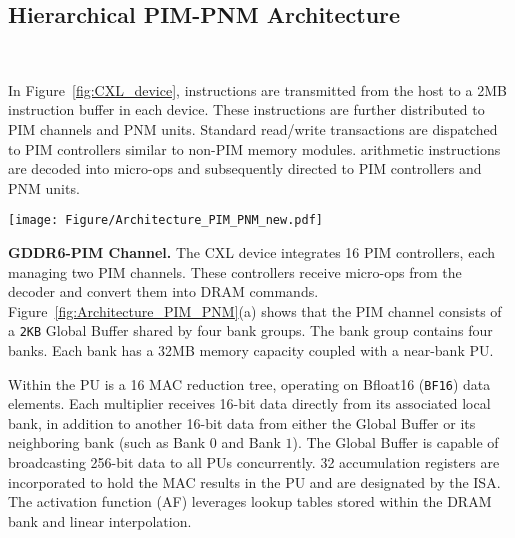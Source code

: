 \vspace{-3mm}

\subsection{Hierarchical PIM-PNM Architecture}~\label{subsec:pim_pnm_arch}

In Figure~\ref{fig:CXL_device}, \att{} instructions are transmitted from the host to a 2MB instruction buffer in each device. These instructions are further distributed to PIM channels and PNM units.
Standard read/write transactions are dispatched to PIM controllers similar to non-PIM memory modules. \att{} arithmetic instructions are decoded into micro-ops and subsequently directed to PIM controllers and PNM units. 

\begin{figure*}[htbp]
	\centering
  	\texttt{[image: Figure/Architecture\_PIM\_PNM\_new.pdf]}
    \caption{Hierarchical PIM-PNM Architecture}
	\label{fig:Architecture_PIM_PNM}
\end{figure*}

\textbf{GDDR6-PIM Channel.}
The CXL device integrates 16 PIM controllers, each managing two PIM channels. These controllers receive micro-ops from the decoder and convert them into DRAM commands.
Figure~\ref{fig:Architecture_PIM_PNM}(a) shows that the PIM channel consists of a \texttt{2KB} Global Buffer shared by four bank groups.
The bank group contains four banks.
Each bank has a 32MB memory capacity coupled with a near-bank PU.
% 

Within the PU is a 16 MAC reduction tree, operating on Bfloat16 (\texttt{BF16}) data elements. Each multiplier receives 16-bit data directly from its associated local bank, in addition to another 16-bit data from either the Global Buffer or its neighboring bank (such as Bank $0$ and Bank $1$). 
The Global Buffer is capable of broadcasting 256-bit data to all PUs concurrently. 32 accumulation registers are incorporated to hold the MAC results in the PU and are designated by the \att{} ISA. The activation function (AF) leverages lookup tables stored within the DRAM bank and linear interpolation. 

